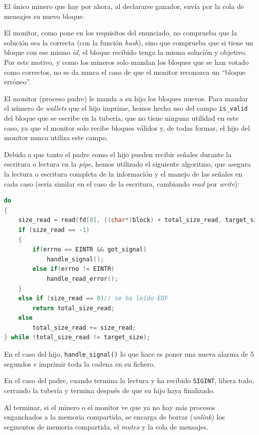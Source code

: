 \documentclass{article}
\begin{document}
    El único minero que hay por ahora, al declararse ganador, envía por la cola de mensajes su nuevo bloque.

    El monitor, como pone en los requisitos del enunciado, no comprueba que la solución sea la correcta (con la función \emph{hash}), sino que comprueba que si tiene un bloque con ese mismo \emph{id}, el bloque recibido tenga la misma solución y objetivo. Por este motivo, y como los mineros solo mandan los bloques que se han votado como correctos, no se da nunca el caso de que el monitor reconozca un ``bloque erróneo''.

    El monitor (proceso padre) le manda a su hijo los bloques nuevos. Para mandar el número de \emph{wallets} que el hijo imprime, hemos hecho uso del campo \texttt{is\_valid} del bloque que se escribe en la tubería, que no tiene ninguna utilidad en este caso, ya que el monitor solo recibe bloques válidos y, de todas formas, el hijo del monitor nunca utiliza este campo.
    
    Debido a que tanto el padre como el hijo pueden recibir señales durante la escritura o lectura en la \textit{pipe}, hemos utilizado el siguiente algoritmo, que asegura la lectura o escritura completa de la información y el manejo de las señales en cada caso (sería similar en el caso de la escritura, cambiando \emph{read} por \emph{write}):

    \begin{lstlisting}[language=C, texcl=true]
do
{
    size_read = read(fd[0], ((char*)block) + total_size_read, target_size - total_size_read);
    if (size_read == -1)
    {
        if(errno == EINTR && got_signal)
            handle_signal();
        else if(errno != EINTR)
            handle_read_error();
    }
    else if (size_read == 0)// se ha leído EOF
        return total_size_read;
    else
        total_size_read += size_read;
} while (total_size_read != target_size);\end{lstlisting}

    En el caso del hijo, \texttt{handle\_signal()} lo que hace es poner una nueva alarma de 5 segundos e imprimir toda la cadena en su fichero.

    En el caso del padre, cuando termina la lectura y ha recibido \texttt{SIGINT}, libera todo, cerrando la tubería y termina después de que su hijo haya finalizado.

    Al terminar, si el minero o el monitor ve que ya no hay más procesos enganchados a la memoria compartida, se encarga de borrar (\emph{unlink}) los segmentos de memoria compartida, el \emph{mutex} y la cola de mensajes.
\end{document}
